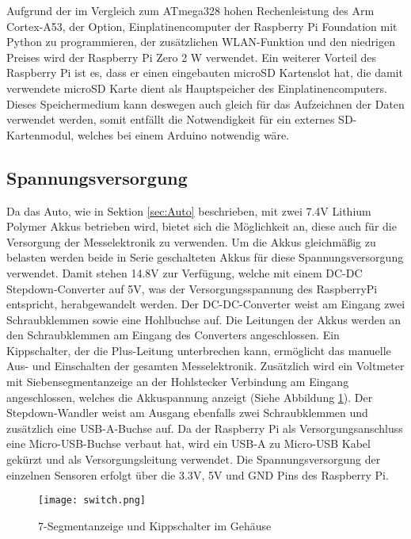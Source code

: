 Aufgrund der im Vergleich zum ATmega328 hohen Rechenleistung des Arm Cortex-A53, der Option, Einplatinencomputer der Raspberry Pi Foundation mit Python zu programmieren, der zusätzlichen \ac{WLAN}-Funktion und den niedrigen Preises wird der Raspberry Pi Zero 2 W verwendet. Ein weiterer Vorteil des Raspberry Pi ist es, dass er einen eingebauten microSD Kartenslot hat, die damit verwendete microSD Karte dient als Hauptspeicher des Einplatinencomputers. Dieses Speichermedium kann deswegen auch gleich für das Aufzeichnen der Daten verwendet werden, somit entfällt die Notwendigkeit für ein externes SD-Kartenmodul, welches bei einem Arduino notwendig wäre.

\subsection{Spannungsversorgung}
\label{subsec:elekSupply}
Da das Auto, wie in Sektion \ref{sec:Auto} beschrieben, mit zwei 7.4\ac{V} Lithium Polymer Akkus betrieben wird, bietet sich die Möglichkeit an, diese auch für die Versorgung der Messelektronik zu verwenden. Um die Akkus gleichmäßig zu belasten werden beide in Serie geschalteten Akkus für diese Spannungsversorgung verwendet. Damit stehen 14.8\ac{V} zur Verfügung, welche mit einem DC-DC Stepdown-Converter auf 5\ac{V}, was der Versorgungsspannung des RaspberryPi entspricht, herabgewandelt werden. Der DC-DC-Converter weist am Eingang zwei Schraubklemmen sowie eine Hohlbuchse auf. Die Leitungen der Akkus werden an den Schraubklemmen am Eingang des Converters angeschlossen. Ein Kippschalter, der die Plus-Leitung unterbrechen kann, ermöglicht das manuelle Aus- und Einschalten der gesamten Messelektronik. Zusätzlich wird ein Voltmeter mit Siebensegmentanzeige an der Hohlstecker Verbindung am Eingang angeschlossen, welches die Akkuspannung anzeigt (Siehe Abbildung \ref{fig:switch}). Der Stepdown-Wandler weist am Ausgang ebenfalls zwei Schraubklemmen und zusätzlich eine \ac{USB}-A-Buchse auf. Da der Raspberry Pi als Versorgungsanschluss eine Micro-\ac{USB}-Buchse verbaut hat, wird ein USB-A zu Micro-\ac{USB} Kabel gekürzt und als Versorgungsleitung verwendet. Die Spannungsversorgung der einzelnen Sensoren erfolgt über die 3.3\ac{V}, 5\ac{V} und GND Pins des Raspberry Pi. 

\begin{figure}[h]
\centering
\texttt{[image: switch.png]}
\caption{7-Segmentanzeige und Kippschalter im Gehäuse}
\label{fig:switch}
\end{figure}

